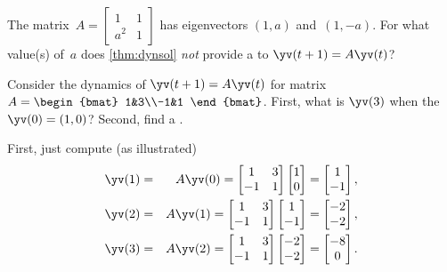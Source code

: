 \begin{activity}
The matrix~\(A=\begin{bmatrix} 1&1\\a^2&1 \end{bmatrix}\) has eigenvectors \((1,a)\) and~\((1,-a)\).
For what value(s) of~\(a\) does \autoref{thm:dynsol} \emph{not} provide a  to \(\yv(t+1)=A\yv(t)\)?
\end{activity}




\begin{example} \label{eg:2x2ccgrow}
Consider the dynamics of \(\yv(t+1)=A\yv(t)\) for matrix \(A=\begin{bmat} 1&3\\-1&1 \end{bmat}\).
First, what is \(\yv(3)\) when the  \(\yv(0)=(1,0)\)?
Second, find a .
\begin{solution} 
First, just compute (as illustrated)
\begin{eqnarray*}
\yv(1)&=&A\yv(0)=\begin{bmatrix} 1&3\\-1&1 \end{bmatrix}
\begin{bmatrix} 1\\0 \end{bmatrix}
=\begin{bmatrix} 1\\-1 \end{bmatrix},
\\\yv(2)&=&A\yv(1)=\begin{bmatrix} 1&3\\-1&1 \end{bmatrix}
\begin{bmatrix} 1\\-1 \end{bmatrix}
=\begin{bmatrix} -2\\-2 \end{bmatrix},
\\\yv(3)&=&A\yv(2)=\begin{bmatrix} 1&3\\-1&1 \end{bmatrix}
\begin{bmatrix} -2\\-2 \end{bmatrix}
=\begin{bmatrix} -8\\0 \end{bmatrix}.

\end{eqnarray*}
\end{solution}
\end{example}
